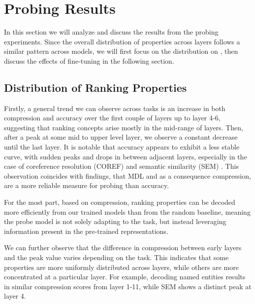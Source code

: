 \chapter{Probing Results}
\label{chap:results}
In this section we will analyze and discuss the results from the probing experiments. Since the overall distribution of properties across layers follows a similar pattern across models, we will first focus on the distribution on , then discuss the effects of fine-tuning in the following section.

\section{Distribution of Ranking Properties}
Firstly, a general trend we can observe across tasks is an increase in both compression and accuracy over the first couple of layers up to layer 4-6, suggesting that ranking concepts arise mostly in the mid-range of layers. Then, after a peak at some mid to upper level layer, we observe a constant decrease until the last layer. It is notable that accuracy appears to exhibit a less stable curve, with sudden peaks and drops in between adjacent layers, especially in the case of coreference resolution (COREF) and semantic similarity (SEM) . This observation coincides with \citep{voita-titov-2020-information} findings, that MDL and as a consequence compression, are a more reliable measure for probing than accuracy.

For the most part, based on compression, ranking properties can be decoded more efficiently from our trained models than from the random baseline, meaning the probe model is not solely adapting to the task, but instead leveraging information present in the pre-trained representations.

We can further observe that the difference in compression between early layers and the peak value varies depending on the task. This indicates that some properties are more uniformly distributed across layers, while others are more concentrated at a particular layer. For example, decoding named entities results in similar compression scores from layer 1-11, while SEM shows a distinct peak at layer 4.

